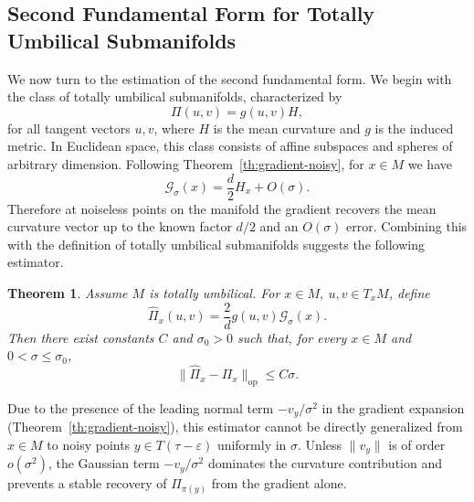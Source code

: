 \documentclass[11pt]{article}
\theoremstyle{plain}
\newtheorem{theorem}{Theorem}[section]
\theoremstyle{definition}
\begin{document}
\subsection{Second Fundamental Form for Totally Umbilical Submanifolds}
We now turn to the estimation of the second fundamental form. We begin with the class of totally umbilical submanifolds, characterized by
\[
\Pi(u,v) = g(u,v)H, 
\]
for all tangent vectors $u,v$, where $H$ is the mean curvature and $g$ is the induced metric. In Euclidean space, this class consists of affine subspaces and spheres of arbitrary dimension. Following Theorem~\ref{th:gradient-noisy}, for $x\in M$ we have
\[
  \mathcal G_\sigma(x)
  = \frac{d}{2} H_x + O(\sigma).
\]
Therefore at noiseless points on the manifold the gradient recovers the mean curvature vector up to the known factor $d/2$ and an $O(\sigma)$ error. Combining this with the definition of totally umbilical submanifolds suggests the following estimator.
\begin{theorem}\label{th:umbilical-submanifold}
Assume $M$ is totally umbilical. For $x\in M,\ u,v \in T_xM$, define
\[
\widehat{\Pi}_x(u,v) = \frac{2}{d}g(u,v)\mathcal G_\sigma(x).
\]
Then there exist constants $C$ and $\sigma_0>0$ such that, for every $x\in M$ and $0<\sigma\le\sigma_0$,
\[
\|\widehat{\Pi}_x-\Pi_x\|_{\mathrm{op}} \le C \sigma.
\]
\end{theorem}
Due to the presence of the leading normal term $-v_y/\sigma^2$ in the gradient expansion (Theorem~\ref{th:gradient-noisy}), this estimator cannot be directly generalized from $x\in M$ to noisy points $y\in T(\tau-\varepsilon)$ uniformly in $\sigma$. Unless $\|v_y\|$ is of order $o(\sigma^2)$, the Gaussian term $-v_y/\sigma^2$ dominates the curvature contribution and prevents a stable recovery of $\Pi_{\pi(y)}$ from the gradient alone.
\end{document}
